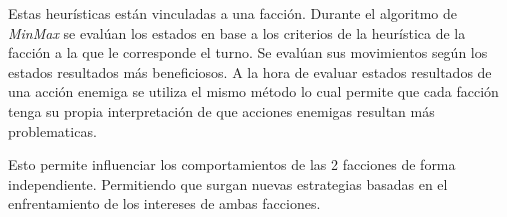 \documentclass{llncs}
\begin{document}
Estas heur\'isticas est\'an vinculadas a una facci\'on. Durante el algoritmo de \emph{MinMax} se eval\'uan los estados en base a los criterios de la heur\'istica de la facci\'on a la que le corresponde el turno. Se eval\'uan sus movimientos seg\'un los estados resultados m\'as beneficiosos. A la hora de evaluar estados resultados de una acci\'on enemiga se utiliza el mismo m\'etodo lo cual permite que cada facci\'on tenga su propia interpretaci\'on de que acciones enemigas resultan m\'as problematicas.

Esto permite influenciar los comportamientos de las 2 facciones de forma independiente. Permitiendo que surgan nuevas estrategias basadas en el enfrentamiento de los intereses de ambas facciones.



\clearpage
{} %
\renewcommand{\indexname}{Author Index}
\printindex
\clearpage
{} %
\renewcommand{\indexname}{Subject Index}
% 
\end{document}
